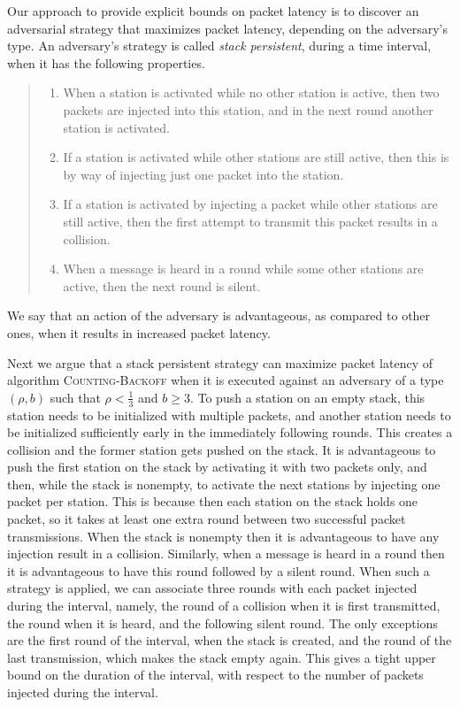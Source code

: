 \documentclass[11pt]{article}
\begin{document}
Our approach to provide explicit bounds on packet latency is to discover an adversarial strategy that maximizes packet latency, depending on the adversary's type.
An adversary's strategy is called \emph{stack persistent}, during a time interval,  when it has the following properties.
\begin{quote}
\begin{enumerate}
\item
When a station is activated while no other station is active, then two packets are injected into this station, and in the next round another station is activated.
\item
If a station is activated while other stations are still active, then this is by way of injecting just one packet into the station.
\item
If a station is activated by injecting a packet while other stations are still active, then the first attempt to transmit this packet results in a collision. 
\item
When a message is heard in a round while some other stations are active, then the next round is silent.
\end{enumerate}
\end{quote}
We say that an action of the adversary is advantageous, as compared to other ones, when it results in increased packet latency. 

Next we argue that a stack persistent strategy can maximize packet latency of algorithm \textsc{Counting-Back\-off} when it is executed against an adversary of a type $(\rho,b)$ such that $\rho < \frac{1}{3}$ and $b\ge 3$. 
To push a station on an empty stack, this station needs to be initialized with multiple packets, and another station needs to be initialized sufficiently early in the immediately following rounds.
This creates a collision and the former station gets pushed on the stack.
It is advantageous to push the first station on the stack by activating it with two packets only, and then, while the stack is nonempty, to activate the next stations by injecting one packet per station.
This is because then each station on the stack holds one packet, so it takes at least one extra round between two successful packet transmissions.
When the stack is nonempty then it is advantageous to have any injection result in a collision.
Similarly, when a message is heard in a round then it is advantageous to have this round followed by a silent round.
When such a strategy is applied, we can associate three rounds with each packet injected during the interval, namely, the round of a collision when it is first transmitted, the round when it is heard, and the following silent round.
The only exceptions are the first round of the interval, when the stack is created, and the round of the last transmission, which makes the stack empty again.
This gives a tight upper bound on the duration of the interval, with respect to the number of packets injected during the interval.
\end{document}
